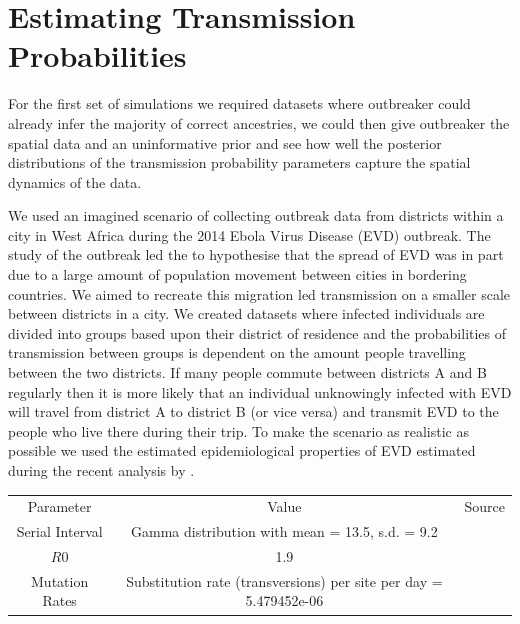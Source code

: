 \documentclass[11pt,a4paper]{report}
\begin{document}
\section{Estimating Transmission Probabilities}

For the first set of simulations we required datasets where outbreaker could already infer the majority of correct ancestries, we could then give outbreaker the spatial data and an uninformative prior and see how well the posterior distributions of the transmission probability parameters capture the spatial dynamics of the data.



We used an imagined scenario of collecting outbreak data from districts within a city in West Africa during the 2014 Ebola Virus Disease (EVD) outbreak. The study of the outbreak led the \citet{Ebola14} to hypothesise that the spread of EVD was in part due to a large amount of population movement between cities in bordering countries. We aimed to recreate this migration led transmission on a smaller scale between districts in a city. We created datasets where infected individuals are divided into groups based upon their district of residence and the probabilities of transmission between groups is dependent on the amount people travelling between the two districts. If many people commute between districts A and B regularly then it is more likely that an individual unknowingly infected with EVD will travel from district A to district B (or vice versa) and transmit EVD to the people who live there during their trip. To make the scenario as realistic as possible  we used the estimated epidemiological properties of EVD estimated during the recent analysis by \citet{Ebola14}.

\begin{tabular}{| c | c | c |}
Parameter & Value & Source \\
Serial Interval & Gamma distribution with mean = 13.5, s.d. = 9.2 & \citet{Ebola14} \\
$R0$ & 1.9 & \citet{Ebola14} \\
Mutation Rates & Substitution rate (transversions) per site per day =  5.479452e-06 & \citet{Gire14} \\

\end{tabular}
\end{document}
